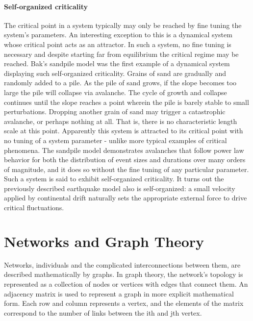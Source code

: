 \documentclass[12pt]{article}
\begin{document}
\paragraph{Self-organized criticality} 

The critical point in a system typically may only be reached by fine tuning the system's parameters. An interesting exception to this is a dynamical system whose critical point acts as an attractor. In such a system, no fine tuning is necessary and despite starting far from equilibrium the critical regime may be reached. Bak's sandpile model\cite{Bak1987a} was the first example of a dynamical system displaying such self-organized criticality. Grains of sand are gradually and randomly added to a pile. As the pile of sand grows, if the slope becomes too large the pile will collapse via avalanche. The cycle of growth and collapse continues until the slope reaches a point wherein the pile is barely stable to small perturbations. Dropping another grain of sand may trigger a catastrophic avalanche, or perhaps nothing at all. That is, there is no characteristic length scale at this point. Apparently this system is attracted to its critical point with no tuning of a system parameter - unlike more typical examples of critical phenomena. The sandpile model demonstrates avalanches that follow power law behavior for both the distribution of event sizes and durations over many orders of magnitude, and it does so without the fine tuning of any particular parameter. Such a system is said to exhibit self-organized criticality. It turns out the previously described earthquake model also is self-organized: a small velocity applied by continental drift naturally sets the appropriate external force to drive critical fluctuations\cite{Sethna2011a}. 


\section*{Networks and Graph Theory}

Networks, individuals and the complicated interconnections between them, are described mathematically by graphs. In graph theory, the network's topology is represented as a collection of nodes or vertices with edges that connect them. An adjacency matrix is used to represent a graph in more explicit mathematical form. Each row and column represents a vertex, and the elements of the matrix correspond to the number of links between the ith and jth vertex.
\end{document}
